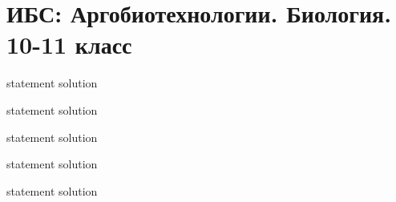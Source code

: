 \chapter{ИБС: Аргобиотехнологии. Биология. 10-11 класс}

{statement}
{solution}

{statement}
{solution}

{statement}
{solution}

{statement}
{solution}

{statement}
{solution}